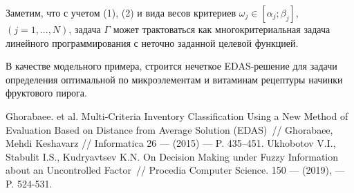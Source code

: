Заметим, что с учетом (1), (2) и вида весов критериев $\omega_{j} \in [\alpha_{j};\beta_{j}]$, $(j=1, ..., N)$, задача $\varGamma$ может трактоваться как 
многокритериальная задача линейного программирования с неточно заданной целевой функцией.

В качестве модельного примера, строится нечеткое EDAS-решение для задачи определения оптимальной по микроэлементам и витаминам рецептуры начинки фруктового пирога.


\begin{thebibliography}{9} %
 Ghorabaee. et al. Multi-Criteria Inventory Classification Using a New Method of Evaluation Based on Distance from Average Solution (EDAS)~// Ghorabaee, Mehdi Keshavarz // Informatica 26 — (2015) — P. 435–451.
 Ukhobotov V.I., Stabulit I.S., Kudryavtsev K.N. On Decision Making under Fuzzy Information about an Uncontrolled Factor~// Procedia Computer Science. 150 — (2019),  — P. 524-531.

\end{thebibliography}





%

